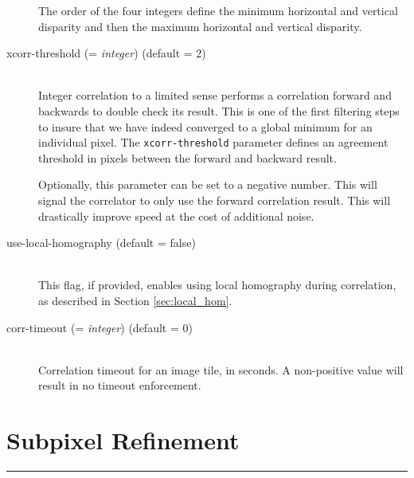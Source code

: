 \begin{description}
  The order of the four integers define the minimum horizontal and
  vertical disparity and then the maximum horizontal and vertical
  disparity.

\item[xcorr-threshold \textnormal{\small{(= \emph{integer})}} (default = 2)] \hfill \\

  Integer correlation to a limited sense performs a correlation
  forward and backwards to double check its result. This is one of the
  first filtering steps to insure that we have indeed converged to a
  global minimum for an individual pixel. The \texttt{xcorr-threshold}
  parameter defines an agreement threshold in pixels between the
  forward and backward result.

  Optionally, this parameter can be set to a negative number. This
  will signal the correlator to only use the forward correlation
  result. This will drastically improve speed at the cost of
  additional noise.

\item[use-local-homography \textnormal (default = false)] \hfill \\

  This flag, if provided, enables using local homography during
  correlation, as described in Section \ref{sec:local_hom}.

\item[corr-timeout \textnormal{\small{(= \emph{integer})}} (default = 0)]\hfill \\

  Correlation timeout for an image tile, in seconds. A non-positive
value will result in no timeout enforcement.

\end{description}

\section{Subpixel Refinement}
\hrule
\bigskip

